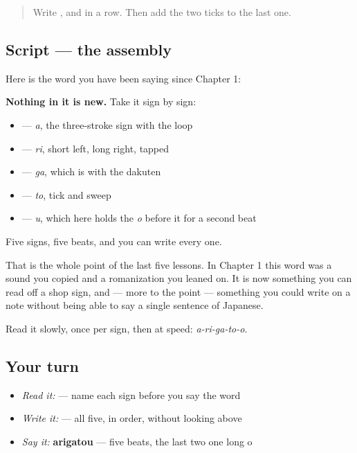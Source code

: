 \label{lesson:JA-W03-arigatou-read}



\begin{quote}
Write ,  and  in a row. Then add the two ticks to the last one.
\end{quote}

\subsection*{Script — the assembly}

Here is the word you have been saying since Chapter 1:

\begin{quote}
\end{quote}

\textbf{Nothing in it is new.} Take it sign by sign:

\begin{itemize}
\raggedright
  \item \textbf{} — \emph{a}, the three-stroke sign with the loop
  \item \textbf{} — \emph{ri}, short left, long right, tapped
  \item \textbf{} — \emph{ga}, which is  with the dakuten
  \item \textbf{} — \emph{to}, tick and sweep
  \item \textbf{} — \emph{u}, which here holds the \emph{o} before it for a second beat
\end{itemize}

Five signs, five beats, and you can write every one.

That is the whole point of the last five lessons. In Chapter 1 this word was a sound you copied and a romanization you leaned on. It is now something you can read off a shop sign, and — more to the point — something you could write on a note without being able to say a single sentence of Japanese.

Read it slowly, once per sign, then at speed: \emph{a-ri-ga-to-o}.

\subsection*{Your turn}
\begin{itemize}
\raggedright
  \item \emph{Read it:}  — name each sign before you say the word
  \item \emph{Write it:}  — all five, in order, without looking above
  \item \emph{Say it:} \textbf{arigatou} — five beats, the last two one long o
\end{itemize}

